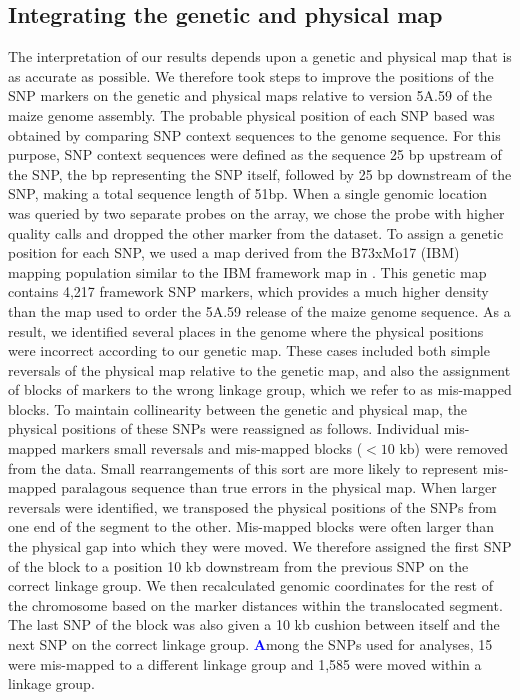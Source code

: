 \documentclass[twocolumn,twoside,letterpaper]{article}
\newcommand{\rev}[1]{\textcolor{blue}{\bf #1}}
\begin{document}
\subsection*{Integrating the genetic and physical map}
The interpretation of our results depends upon a genetic and physical map that is as accurate as possible. 
We therefore took steps to improve the positions of the SNP markers on the genetic and physical maps relative to version 5A.59 of the maize genome assembly. 
The probable physical position of each SNP based was obtained by comparing SNP context sequences to the genome sequence. 
For this purpose, SNP context sequences were defined as the sequence 25 bp upstream of the SNP, the bp representing the SNP itself, followed by 25 bp downstream of the SNP, making a total sequence length of 51bp. 
When a single genomic location was queried by two separate probes on the array, we chose the probe with higher quality calls and dropped the other marker from the dataset. 
To assign a genetic position for each SNP, we used a map derived from the B73xMo17 (IBM) mapping population similar to the IBM framework map in \citet{ganal2011a-large}. 
This genetic map contains 4,217 framework SNP markers, which provides a much higher density than the map used to order the 5A.59 release of the maize genome sequence. 
As a result, we identified several places in the genome where the physical positions were incorrect according to our genetic map. 
These cases included both simple reversals of the physical map relative to the genetic map, and also the assignment of blocks of markers to the wrong linkage group, which we refer to as mis-mapped blocks. 
To maintain collinearity between the genetic and physical map, the physical positions of these SNPs were reassigned as follows. 
Individual mis-mapped markers small reversals and mis-mapped blocks ($<10$ kb) were removed from the data. 
Small rearrangements of this sort are more likely to represent mis-mapped paralagous sequence than true errors in the physical map. 
When larger reversals were identified, we transposed the physical positions of the SNPs from one end of the segment to the other. 
Mis-mapped blocks were often larger than the physical gap into which they were moved. 
We therefore assigned the first SNP of the block to a position 10 kb downstream from the previous SNP on the correct linkage group. 
We then recalculated genomic coordinates for the rest of the chromosome based on the marker distances within the translocated segment. 
The last SNP of the block was also given a 10 kb cushion between itself and the next SNP on the correct linkage group. 
\rev Among the SNPs used for analyses, 15 were mis-mapped to a different linkage group and 1,585 were moved within a linkage group.
\end{document}
